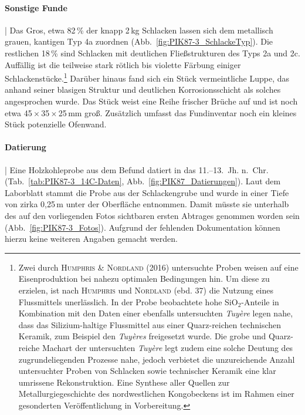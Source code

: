 \paragraph{Sonstige Funde}\hspace{-.5em}|\hspace{.5em}%
Das Gros, etwa 82\,\% der knapp 2\,kg Schlacken lassen sich dem metallisch grauen, kantigen Typ 4a zuordnen (Abb.~\ref{fig:PIK87-3_SchlackeTyp}). Die restlichen 18\,\% sind Schlacken mit deutlichen Fließstrukturen des Typs 2a und 2c. Auffällig ist die teilweise stark rötlich bis violette Färbung einiger Schlackenstücke.\footnote{Zwei durch \textsc{Humphris \& Nordland} (2016) untersuchte Proben weisen auf eine Eisenproduktion bei nahezu optimalen Bedingungen hin. Um diese zu erzielen, ist nach \textsc{Humphris} und \textsc{Nordland} (ebd. 37) die Nutzung eines Flussmittels unerlässlich. In der Probe beobachtete hohe SiO$_{2}$-Anteile in Kombination mit den Daten einer ebenfalls untersuchten \textit{Tuyère} legen nahe, dass das Silizium-haltige Flussmittel aus einer Quarz-reichen technischen Keramik, zum Beispiel den \textit{Tuyères} freigesetzt wurde. Die grobe und Quarz-reiche Machart der untersuchten \textit{Tuyère} legt zudem eine solche Deutung des zugrundeliegenden Prozesse nahe, jedoch verbietet die unzureichende Anzahl untersuchter Proben von Schlacken sowie technischer Keramik eine klar umrissene Rekonstruktion. Eine Synthese aller Quellen zur Metallurgiegeschichte des nordwestlichen Kongobeckens ist im Rahmen einer gesonderten Veröffentlichung in Vorbereitung.} Darüber hinaus fand sich ein Stück vermeintliche Luppe, das anhand seiner blasigen Struktur und deutlichen Korrosionsschicht als solches angesprochen wurde. Das Stück weist eine Reihe frischer Brüche auf und ist noch etwa 45\,$\times$\,35\,$\times$\,25\,mm groß. Zusätzlich umfasst das Fundinventar noch ein kleines Stück potenzielle Ofenwand.

\paragraph{Datierung}\hspace{-.5em}|\hspace{.5em}%
Eine Holzkohleprobe aus dem Befund datiert in das 11.--13.~Jh. n.~Chr. (Tab.~\ref{tab:PIK87-3_14C-Daten}, Abb.~\ref{fig:PIK87_Datierungen}). Laut dem Laborblatt stammt die Probe aus der Schlackengrube und wurde in einer Tiefe von zirka 0,25\,m unter der Oberfläche entnommen. Damit müsste sie unterhalb des auf den vorliegenden Fotos sichtbaren ersten Abtrages genommen worden sein (Abb.~\ref{fig:PIK87-3_Fotos}). Aufgrund der fehlenden Dokumentation können hierzu keine weiteren Angaben gemacht werden.

